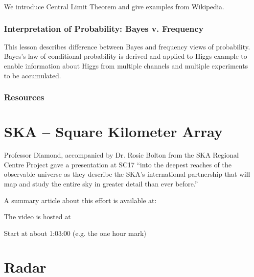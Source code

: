 We introduce Central Limit Theorem and give examples from Wikipedia.


\subsubsection{Interpretation of Probability: Bayes v.  Frequency}

This lesson describes difference between Bayes and frequency views of
probability. Bayes's law of conditional probability is derived and
applied to Higgs example to enable information about Higgs from multiple
channels and multiple experiments to be accumulated.


\subsubsection{Resources}


\section{SKA -- Square Kilometer Array}


Professor Diamond, accompanied by Dr. Rosie Bolton from the SKA
Regional Centre Project gave a presentation at SC17 ``into the deepest
reaches of the observable universe as they describe the SKA’s
international partnership that will map and study the entire sky in
greater detail than ever before.''


A summary article about this effort is available at:


The video is hosted at 


Start at about 1:03:00 (e.g. the one hour mark)


\section{Radar}

